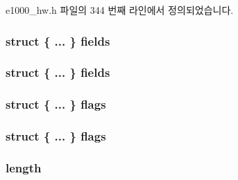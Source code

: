 e1000\+\_\+hw.\+h 파일의 344 번째 라인에서 정의되었습니다.

\subsubsection[{\texorpdfstring{fields}{fields}}]{\setlength{\rightskip}{0pt plus 5cm}struct \{ ... \}   fields}\hypertarget{structe1000__data__desc_accf80b8ed4609349eef3a51f78aa41f4}{}\label{structe1000__data__desc_accf80b8ed4609349eef3a51f78aa41f4}
\subsubsection[{\texorpdfstring{fields}{fields}}]{\setlength{\rightskip}{0pt plus 5cm}struct \{ ... \}   fields}\hypertarget{structe1000__data__desc_acee1dff414bac6f86827124724f02b0e}{}\label{structe1000__data__desc_acee1dff414bac6f86827124724f02b0e}
\subsubsection[{\texorpdfstring{flags}{flags}}]{\setlength{\rightskip}{0pt plus 5cm}struct \{ ... \}   flags}\hypertarget{structe1000__data__desc_a4c68407ac083033747650a4f401a6816}{}\label{structe1000__data__desc_a4c68407ac083033747650a4f401a6816}
\subsubsection[{\texorpdfstring{flags}{flags}}]{\setlength{\rightskip}{0pt plus 5cm}struct \{ ... \}   flags}\hypertarget{structe1000__data__desc_ae92ac76aa982b9d3ee3b8c04dda19d81}{}\label{structe1000__data__desc_ae92ac76aa982b9d3ee3b8c04dda19d81}
\subsubsection[{\texorpdfstring{length}{length}}]{ length}\hypertarget{structe1000__data__desc_adb05ebb496f195c1ce4e49f46fb420f0}{}\label{structe1000__data__desc_adb05ebb496f195c1ce4e49f46fb420f0}


